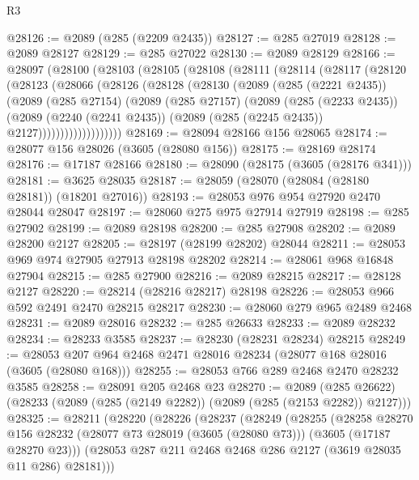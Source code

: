 \begin{lexlean}{R3}
\begin{coremodule}
@28126 := @2089 (@285 (@2209 @2435))
@28127 := @285 @27019
@28128 := @2089 @28127
@28129 := @285 @27022
@28130 := @2089 @28129
@28166 := @28097
    (@28100
      (@28103
        (@28105
          (@28108
            (@28111
              (@28114
                (@28117
                  (@28120
                    (@28123
                      (@28066
                        (@28126
                          (@28128
                            (@28130
                              (@2089
                                (@285 (@2221 @2435))
                                (@2089
                                  (@285 @27154)
                                  (@2089
                                    (@285 @27157)
                                    (@2089
                                      (@285 (@2233 @2435))
                                      (@2089
                                        (@2240 (@2241 @2435))
                                        (@2089 (@285 (@2245 @2435)) @2127)))))))))))))))))))
@28169 := @28094 @28166 @156 @28065
@28174 := @28077 @156 @28026 (@3605 (@28080 @156))
@28175 := @28169 @28174
@28176 := @17187 @28166
@28180 := @28090 (@28175 (@3605 (@28176 @341)))
@28181 := @3625 @28035
@28187 := @28059 (@28070 (@28084 (@28180 @28181)) (@18201 @27016))
@28193 := @28053 @976 @954 @27920 @2470 @28044 @28047
@28197 := @28060 @275 @975 @27914 @27919
@28198 := @285 @27902
@28199 := @2089 @28198
@28200 := @285 @27908
@28202 := @2089 @28200 @2127
@28205 := @28197 (@28199 @28202) @28044
@28211 := @28053 @969 @974 @27905 @27913 @28198 @28202
@28214 := @28061 @968 @16848 @27904
@28215 := @285 @27900
@28216 := @2089 @28215
@28217 := @28128 @2127
@28220 := @28214 (@28216 @28217) @28198
@28226 := @28053 @966 @592 @2491 @2470 @28215 @28217
@28230 := @28060 @279 @965 @2489 @2468
@28231 := @2089 @28016
@28232 := @285 @26633
@28233 := @2089 @28232
@28234 := @28233 @3585
@28237 := @28230 (@28231 @28234) @28215
@28249 := @28053 @207 @964 @2468 @2471 @28016 @28234 (@28077 @168 @28016 (@3605 (@28080 @168)))
@28255 := @28053 @766 @289 @2468 @2470 @28232 @3585
@28258 := @28091 @205 @2468 @23
@28270 := @2089
    (@285 @26622)
    (@28233 (@2089 (@285 (@2149 @2282)) (@2089 (@285 (@2153 @2282)) @2127)))
@28325 := @28211
    (@28220
      (@28226
        (@28237
          (@28249
            (@28255
              (@28258
                @28270
                @156
                @28232
                (@28077 @73 @28019 (@3605 (@28080 @73)))
                (@3605 (@17187 @28270 @23)))
              (@28053 @287 @211 @2468 @2468 @286 @2127 (@3619 @28035 @11 @286) @28181)))

\end{coremodule}
\end{lexlean}
